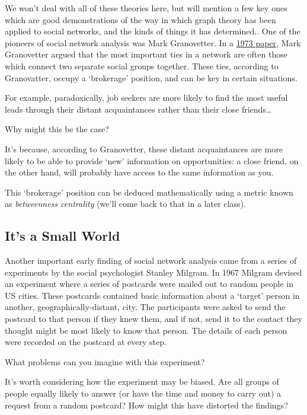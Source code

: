 \documentclass[
]{book}
\begin{document}
We won't deal with all of these theories here, but will mention a few key ones which are good demonstrations of the way in which graph theory has been applied to social networks, and the kinds of things it has determined.. One of the pioneers of social network analysis was Mark Granovetter. In a \href{https://www.jstor.org/stable/2776392}{1973 paper}, Mark Granovetter argued that the most important ties in a network are often those which connect two separate social groups together. These ties, according to Granovatter, occupy a `brokerage' position, and can be key in certain situations.

For example, paradoxically, job seekers are more likely to find the most useful leads through their distant acquaintances rather than their close friends\ldots{}

Why might this be the case?

It's because, according to Granovetter, these distant acquaintances are more likely to be able to provide `new' information on opportunities: a close friend, on the other hand, will probably have access to the same information as you.

This `brokerage' position can be deduced mathematically using a metric known as \emph{betweenness centrality} (we'll come back to that in a later class).

\hypertarget{its-a-small-world}{%
\subsection{It's a Small World}\label{its-a-small-world}}

Another important early finding of social network analysis came from a series of experiments by the social psychologist Stanley Milgram. In 1967 Milgram devised an experiment where a series of postcards were mailed out to random people in US cities. These postcards contained basic information about a `target' person in another, geographically-distant, city. The participants were asked to send the postcard to that person if they knew them, and if not, send it to the contact they thought might be most likely to know that person. The details of each person were recorded on the postcard at every step.

What problems can you imagine with this experiment?

It's worth considering how the experiment may be biased. Are all groups of people equally likely to answer (or have the time and money to carry out) a request from a random postcard? How might this have distorted the findings?
\end{document}
